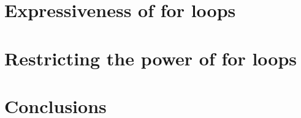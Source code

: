 \documentclass[sigconf]{acmart}
\begin{document}
\section{Expressiveness of for loops}\label{sec:circuits}



\section{Restricting the power of for loops}\label{sec:restrict}


% 

%


\section{Conclusions}\label{sec:conclude}







% 




%
\end{document}
